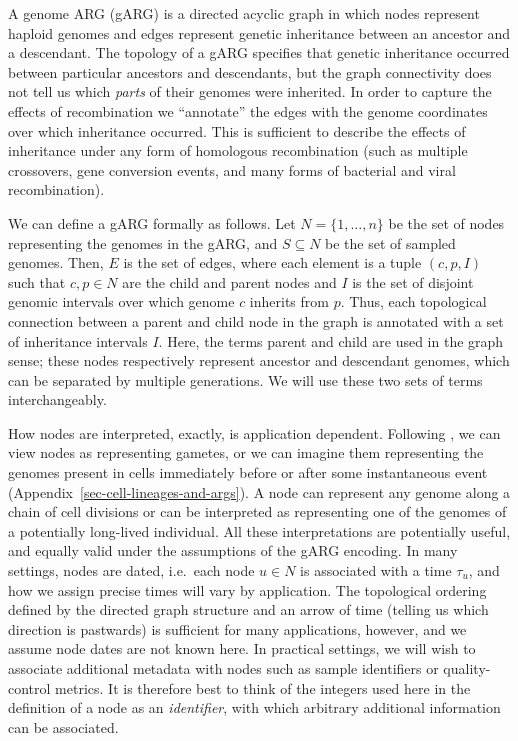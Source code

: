\documentclass{article}
\begin{document}
A genome ARG (gARG) is a directed acyclic graph in which nodes represent
haploid genomes and edges represent
genetic inheritance between an ancestor and a descendant.
The topology of a gARG specifies that genetic inheritance
occurred between particular
ancestors and descendants, but the graph connectivity
does not tell us which \emph{parts} of their genomes were inherited.
In order to capture the effects of recombination
 we ``annotate'' the edges with the genome
coordinates over which inheritance occurred.
This is sufficient to describe the effects of inheritance under
any form of homologous recombination (such as multiple crossovers,
gene conversion events, and many forms of bacterial and viral recombination).

We can define a gARG formally as follows.
Let $N = \{1, \dots, n\}$ be the set of nodes representing
the genomes in the gARG,
and  $S \subseteq N$ be the set of sampled genomes.
Then, $E$ is the set of edges, where each element
is a tuple $(c, p, I)$ such that $c, p \in N$ are the child and
parent nodes and $I$ is the set of disjoint genomic intervals
over which genome $c$ inherits from $p$.
Thus, each topological connection between
a parent and child node in the graph is annotated with a set of
inheritance intervals $I$.
Here, the terms parent and child are used in the graph sense;
these nodes respectively represent ancestor and descendant genomes,
which can be separated by multiple generations.
We will use these two sets of terms interchangeably.

How nodes are interpreted, exactly, is application dependent.
Following \citet{hudson1983properties}, we can view nodes
as representing gametes, or we can imagine them representing
the genomes present in cells immediately before or after
some instantaneous event (Appendix~\ref{sec-cell-lineages-and-args}).
A node can represent any genome along a chain of cell divisions
or can be interpreted as representing one of the genomes of a
potentially long-lived individual. All these interpretations
are potentially useful, and equally valid under the assumptions
of the gARG encoding.
In many settings, nodes are dated, i.e.\ each
node $u\in N$ is associated with a time $\tau_u$,
and how we assign precise times will vary by application.
The topological ordering defined by the directed graph structure
and an arrow of time (telling us which direction is pastwards)
is sufficient for many applications, however,
and we assume node dates are not known here.
In practical settings, we will wish to associate additional
metadata with nodes such as sample identifiers or quality-control metrics.
It is therefore best to think of the
integers used here in the definition of a node as an \emph{identifier},
with which arbitrary additional information can be associated.
\end{document}

